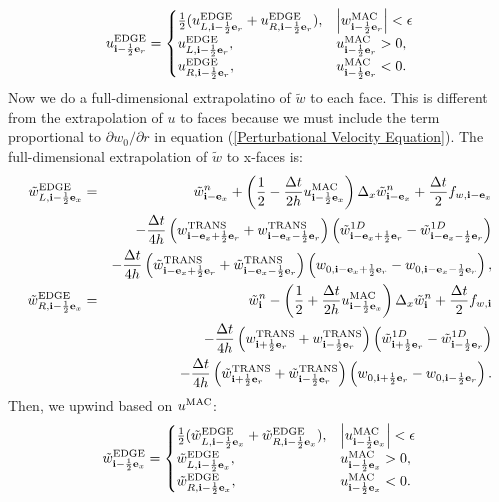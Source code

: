 \documentclass[11pt]{article}
\def\half  {\frac{1}{2}}
\def\dt    {\Delta t}
\def\edge  {\rm EDGE}
\def\mac   {\rm MAC}
\def\trans {\rm TRANS}
\def\eb    {{\bf e}}
\def\ib    {{\bf i}}
\def\wt    {\tilde{w}}
\begin{document}
\begin{equation}
u_{\ib-\half\eb_r}^{\edge} =
\begin{cases}
\half(u_{L,\ib-\half\eb_r}^{\edge} + u_{R,\ib-\half\eb_r}^{\edge}), & \left|w^{\mac}_{\ib-\half\eb_r}\right| < \epsilon \\
u_{L,\ib-\half\eb_r}^{\edge}, & u^{\mac}_{\ib-\half\eb_r} > 0, \\
u_{R,\ib-\half\eb_r}^{\edge}, & u^{\mac}_{\ib-\half\eb_r} < 0.
\end{cases}
\end{equation}
Now we do a full-dimensional extrapolatino of $\wt$ to each face.  This is different from the extrapolation of $u$ to faces because we must include the term proportional to $\partial w_0/\partial r$ in equation (\ref{Perturbational Velocity Equation}).  The full-dimensional extrapolation of $\wt$ to x-faces is:
\begin{eqnarray}
\wt_{L,\ib-\half\eb_x}^{\edge} &=& \wt_{\ib-\eb_x}^n + \left(\half - \frac{\dt}{2h}u_{\ib-\half\eb_x}^{\mac}\right)\Delta_x \wt_{\ib-\eb_x}^n + \frac{\dt}{2}f_{w,\ib-\eb_x} \nonumber \\
&& - \frac{\dt}{4h}\left(w_{\ib-\eb_x+\half\eb_r}^{\trans}+w_{\ib-\eb_x-\half\eb_r}^{\trans}\right)\left(\wt_{\ib-\eb_x+\half\eb_r}^{1D} - \wt_{\ib-\eb_x-\half\eb_r}^{1D}\right) \nonumber \\
&& - \frac{\dt}{4h}\left(\wt_{\ib-\eb_x+\half\eb_r}^{\trans}+\wt_{\ib-\eb_x-\half\eb_r}^{\trans}\right)\left(w_{0,\ib-\eb_x+\half\eb_r}-w_{0,\ib-\eb_x-\half\eb_r}\right), \\
\wt_{R,\ib-\half\eb_x}^{\edge} &=& \wt_{\ib}^n - \left(\half + \frac{\dt}{2h}u_{\ib-\half\eb_x}^{\mac}\right)\Delta_x \wt_{\ib}^n + \frac{\dt}{2}f_{w,\ib} \nonumber \\
&& - \frac{\dt}{4h}\left(w_{\ib+\half\eb_r}^{\trans}+w_{\ib-\half\eb_r}^{\trans}\right)\left(\wt_{\ib+\half\eb_r}^{1D} - \wt_{\ib-\half\eb_r}^{1D}\right) \nonumber \\
&& - \frac{\dt}{4h}\left(\wt_{\ib+\half\eb_r}^{\trans}+\wt_{\ib-\half\eb_r}^{\trans}\right)\left(w_{0,\ib+\half\eb_r}-w_{0,\ib-\half\eb_r}\right).
\end{eqnarray}
Then, we upwind based on $u^{\mac}$:
\begin{equation}
\wt_{\ib-\half\eb_x}^{\edge} =
\begin{cases}
\half(\wt_{L,\ib-\half\eb_x}^{\edge} + \wt_{R,\ib-\half\eb_x}^{\edge}), & \left|u^{\mac}_{\ib-\half\eb_x}\right| < \epsilon \\
\wt_{L,\ib-\half\eb_x}^{\edge}, & u^{\mac}_{\ib-\half\eb_x} > 0, \\
\wt_{R,\ib-\half\eb_x}^{\edge}, & u^{\mac}_{\ib-\half\eb_x} < 0.
\end{cases}
\end{equation}
\end{document}
